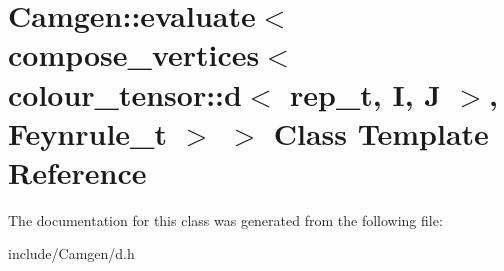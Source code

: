 \hypertarget{a00164}{\section{Camgen\-:\-:evaluate$<$ compose\-\_\-vertices$<$ colour\-\_\-tensor\-:\-:d$<$ rep\-\_\-t, I, J $>$, Feynrule\-\_\-t $>$ $>$ Class Template Reference}
\label{a00164}
}


The documentation for this class was generated from the following file\-:\begin{DoxyCompactItemize}
\item 
include/\-Camgen/d.\-h\end{DoxyCompactItemize}
